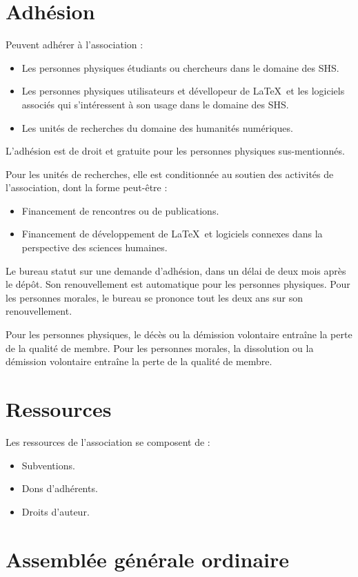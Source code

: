 \documentclass[11pt]{article}
\begin{document}
\section{Adhésion}
Peuvent adhérer à l'association :
\begin{itemize}
	\item Les personnes physiques étudiants ou chercheurs dans le domaine des SHS.
	\item Les personnes physiques utilisateurs et dévellopeur de \LaTeX\ et les logiciels associés qui s'intéressent à son usage dans le domaine des SHS.
	\item Les unités de recherches du domaine des humanités numériques.
\end{itemize}

L'adhésion est de droit et gratuite pour les personnes physiques sus-mentionnés. 

Pour les unités de recherches, elle est conditionnée au soutien des activités de l'association, dont la forme peut-être :
\begin{itemize}
	\item Financement de rencontres ou de publications.
	\item Financement de développement de \LaTeX\ et logiciels connexes dans  la perspective des sciences humaines.
\end{itemize}

Le bureau statut sur une demande d'adhésion, dans un délai de deux mois après le dépôt.
Son renouvellement est automatique pour les personnes physiques. 
Pour les personnes morales, le bureau se prononce tout les deux ans sur son renouvellement.

Pour les personnes physiques, le décès ou la démission volontaire entraîne la perte de la qualité de membre.
Pour les personnes morales, la dissolution ou la démission volontaire entraîne la perte de la qualité de membre. 

\section{Ressources}

Les ressources de l'association se composent de :
\begin{itemize}
	\item Subventions.
	\item Dons d'adhérents.
	\item Droits d'auteur.
\end{itemize}

\section{Assemblée générale ordinaire}
\end{document}
